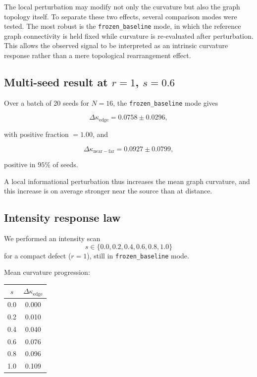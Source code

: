 \documentclass[11pt]{article}
\begin{document}
The local perturbation may modify not only the curvature but also
the graph topology itself. To separate these two effects, several
comparison modes were tested. The most robust is the
\texttt{frozen\_baseline} mode, in which the reference graph
connectivity is held fixed while curvature is re-evaluated after
perturbation. This allows the observed signal to be interpreted as
an intrinsic curvature response rather than a mere topological
rearrangement effect.

\subsection{Multi-seed result at $r=1$, $s=0.6$}

Over a batch of 20 seeds for $N=16$, the \texttt{frozen\_baseline}
mode gives

\[
\Delta \kappa_{\mathrm{edge}} = 0.0758 \pm 0.0296,
\]

with positive fraction $=1.00$, and

\[
\Delta \kappa_{\mathrm{near-far}} = 0.0927 \pm 0.0799,
\]

positive in $95\%$ of seeds.

A local informational perturbation thus increases the mean graph
curvature, and this increase is on average stronger near the source
than at distance.

\subsection{Intensity response law}

We performed an intensity scan
\[
s \in \{0.0,0.2,0.4,0.6,0.8,1.0\}
\]
for a compact defect ($r=1$), still in \texttt{frozen\_baseline} mode.

Mean curvature progression:

\begin{center}
\begin{tabular}{cc}
\toprule
$s$ & $\Delta \kappa_{\mathrm{edge}}$ \\
\midrule
0.0 & 0.000 \\
0.2 & 0.010 \\
0.4 & 0.040 \\
0.6 & 0.076 \\
0.8 & 0.096 \\
1.0 & 0.109 \\
\bottomrule
\end{tabular}
\end{center}
\end{document}
